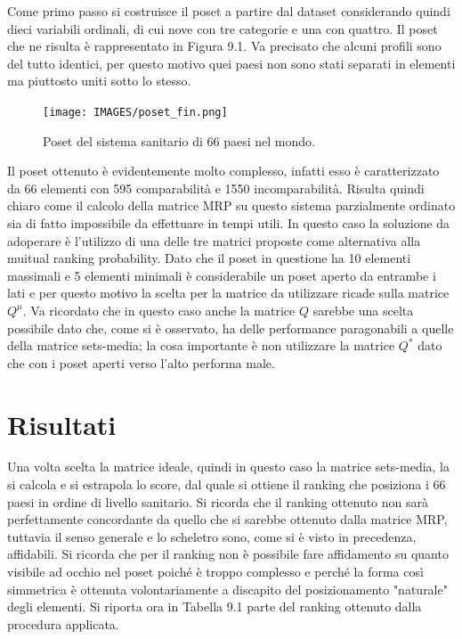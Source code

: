 \documentclass{report}
\begin{document}
Come primo passo si costruisce il poset a partire dal dataset considerando quindi dieci variabili ordinali, di cui nove con tre categorie e una con quattro. Il poset che ne risulta è rappresentato in Figura 9.1. Va precisato che alcuni profili sono del tutto identici, per questo motivo quei paesi non sono stati separati in elementi ma piuttosto uniti sotto lo stesso.

\begin{figure}[H]
    \centering
    \texttt{[image: IMAGES/poset\_fin.png]}
    \caption{Poset del sistema sanitario di 66 paesi nel mondo.}
    \label{fig:roc}
\end{figure}

Il poset ottenuto è evidentemente molto complesso, infatti esso è caratterizzato da 66 elementi con 595 comparabilità e 1550 incomparabilità. Risulta quindi chiaro come il calcolo della matrice MRP su questo sistema parzialmente ordinato sia di fatto impossibile da effettuare in tempi utili. In questo caso la soluzione da adoperare è l'utilizzo di una delle tre matrici proposte come alternativa alla muitual ranking probability. Dato che il poset in questione ha 10 elementi massimali e 5 elementi minimali è considerabile un poset aperto da entrambe i lati e per questo motivo la scelta per la matrice da utilizzare ricade sulla matrice $Q^{\mu}$.  Va ricordato che in questo caso anche la matrice $Q$ sarebbe una scelta possibile dato che, come si è osservato, ha delle performance paragonabili a quelle della matrice sets-media; la cosa importante è non utilizzare la matrice $Q^{*}$ dato che con i poset aperti verso l'alto performa male.


\section{Risultati}
Una volta scelta la matrice ideale, quindi in questo caso la matrice sets-media, la si calcola e si estrapola lo score, dal quale si ottiene il ranking che posiziona i 66 paesi in ordine di livello sanitario. Si ricorda che il ranking ottenuto non sarà perfettamente concordante da quello che si sarebbe ottenuto dalla matrice MRP, tuttavia il senso generale e lo scheletro sono, come si è visto in precedenza, affidabili. Si ricorda che per il ranking non è possibile fare affidamento su quanto visibile ad occhio nel poset poiché è troppo complesso e perché la forma così simmetrica è ottenuta volontariamente a discapito del posizionamento "naturale" degli elementi. Si riporta ora in Tabella 9.1 parte del ranking ottenuto dalla procedura applicata.
\end{document}
